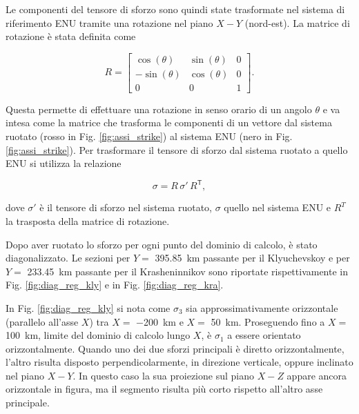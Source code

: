 Le componenti del tensore di sforzo sono quindi state trasformate nel sistema di riferimento ENU tramite una rotazione nel piano \(X-Y\) (nord-est).
La matrice di rotazione è stata definita come

\begin{equation}
    \label{eq:matrice_rotazione}
   R =
    \begin{bmatrix}
    \cos(\theta) & \sin(\theta) & 0 \\
    -\sin(\theta) & \cos(\theta) & 0 \\
    0 & 0 & 1
   \end{bmatrix}.
\end{equation}

Questa permette di effettuare una rotazione in senso orario di un angolo \(\theta\) e va intesa come la matrice che trasforma le componenti di un vettore dal sistema ruotato (rosso in Fig. \ref{fig:assi_strike}) al sistema ENU (nero in Fig. \ref{fig:assi_strike}).
Per trasformare il tensore di sforzo dal sistema ruotato a quello ENU si utilizza la relazione 

\begin{equation}
  \label{eq:rotazione_tensore}
  \sigma = R \, \sigma' \, R^{\mathsf T},
\end{equation}

dove \(\sigma'\) è il tensore di sforzo nel sistema ruotato, \(\sigma \) quello nel sistema ENU e \(R^T\) la trasposta della matrice di rotazione.

Dopo aver ruotato lo sforzo per ogni punto del dominio di calcolo, è stato diagonalizzato. Le sezioni per \(Y=\) \qty{395.85}{\kilo\meter} passante per il Klyuchevskoy e per \(Y=\) \qty{233.45}{\kilo\meter} passante per il Krasheninnikov sono riportate rispettivamente in Fig. \ref{fig:diag_reg_kly} e in Fig. \ref{fig:diag_reg_kra}.

In Fig. \ref{fig:diag_reg_kly} si nota come \(\sigma_3\) sia approssimativamente orizzontale (parallelo all'asse \(X\)) tra \(X=\) \qty{-200}{\kilo\meter} e \(X=\) \qty{50}{\kilo\meter}.
Proseguendo fino a \(X=\) \qty{100}{\kilo\meter}, limite del dominio di calcolo lungo \(X\), è \(\sigma_1\) a essere orientato orizzontalmente.
Quando uno dei due sforzi principali è diretto orizzontalmente, l'altro risulta disposto perpendicolarmente, in direzione verticale, oppure inclinato nel piano \(X-Y\). In questo caso la sua proiezione sul piano \(X-Z\) appare ancora orizzontale in figura, ma il segmento risulta più corto rispetto all'altro asse principale.

